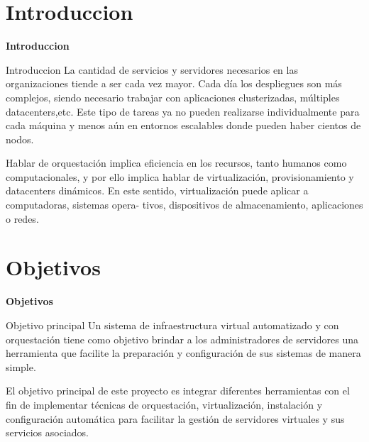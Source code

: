 \documentclass{beamer}
\begin{document}
\section{Introduccion}

\begin{frame}
    \Huge
    \centering
    \textbf{ Introduccion }

\end{frame}


\begin{frame}{Introduccion}
\vspace{-1.5cm}
La cantidad de servicios y servidores necesarios en las organizaciones tiende a ser cada vez mayor.
Cada día los despliegues son más complejos, siendo necesario trabajar con aplicaciones clusterizadas, múltiples datacenters,etc.
Este tipo de tareas ya no pueden realizarse individualmente para cada máquina y menos aún en entornos escalables donde pueden haber cientos de nodos.

\begin{block}{}
Hablar de orquestación implica eficiencia en los recursos, tanto humanos como computacionales, y por ello implica hablar de virtualización, provisionamiento y datacenters dinámicos. En este sentido, virtualización puede aplicar a computadoras, sistemas opera-
tivos, dispositivos de almacenamiento, aplicaciones o redes.
\end{block}

\end{frame}


\section{Objetivos}

\begin{frame}
    \Huge
    \centering
    \textbf{ Objetivos }

\end{frame}

\begin{frame}{Objetivo principal}
\vspace{-1.5cm}
Un sistema de infraestructura virtual automatizado y con orquestación tiene como objetivo brindar a los administradores de servidores una herramienta que facilite la preparación y configuración de sus sistemas de manera simple.

\begin{block}{}
El objetivo principal de este proyecto es integrar diferentes herramientas con el fin de implementar técnicas de orquestación, virtualización, instalación y configuración automática para facilitar la gestión de servidores virtuales y sus servicios asociados.
\end{block}

\end{frame}
\end{document}
